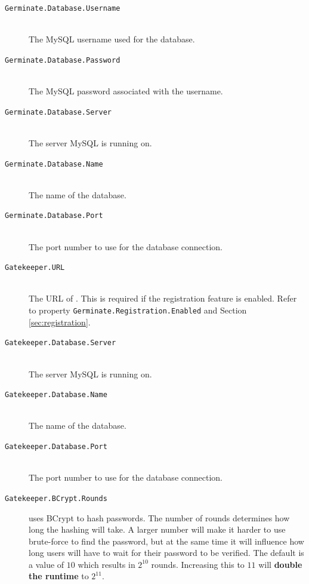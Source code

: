 \label{sec:config-properties}
\begin{description}
	\item[\texttt{Germinate.Database.Username}\nonoptional] \floatright{[String]}\\The MySQL username used for the {\germinate} database.
	\item[\texttt{Germinate.Database.Password}\nonoptional] \floatright{[String]}\\The MySQL password associated with the username.
	\item[\texttt{Germinate.Database.Server}\nonoptional] \floatright{[String]}\\The server MySQL is running on.
	\item[\texttt{Germinate.Database.Name}\nonoptional] \floatright{[String]}\\The name of the {\germinate} database.
	\item[\texttt{Germinate.Database.Port}\nonoptionalif] \floatright{[$x\in\{0,\dots,49151\}$]}\\The port number to use for the database connection.
	\item[\texttt{Gatekeeper.URL}\nonoptionalif] \floatright{[URL]}\\The URL of {\gatekeeper}. This is required if the registration feature is enabled. Refer to property \texttt{Germinate.Registration.Enabled} and Section \ref{sec:registration}.
	\item[\texttt{Gatekeeper.Database.Server}\nonoptionalif] \floatright{[String]}\\The server MySQL is running on.
	\item[\texttt{Gatekeeper.Database.Name}\nonoptionalif] \floatright{[String]}\\The name of the {\gatekeeper} database.
	\item[\texttt{Gatekeeper.Database.Port}\nonoptionalif] \floatright{[$x\in\{0,\dots,49151\}$]}\\The port number to use for the database connection.
    \item[\texttt{Gatekeeper.BCrypt.Rounds}]  uses BCrypt to hash passwords. The number of rounds determines how long the hashing will take. A larger number will make it harder to use brute-force to find the password, but at the same time it will influence how long users will have to wait for their password to be verified. The default is a value of $10$ which results in $2^{10}$ rounds. Increasing this to $11$ will \textbf{double the runtime} to $2^{11}$.

\end{description}
